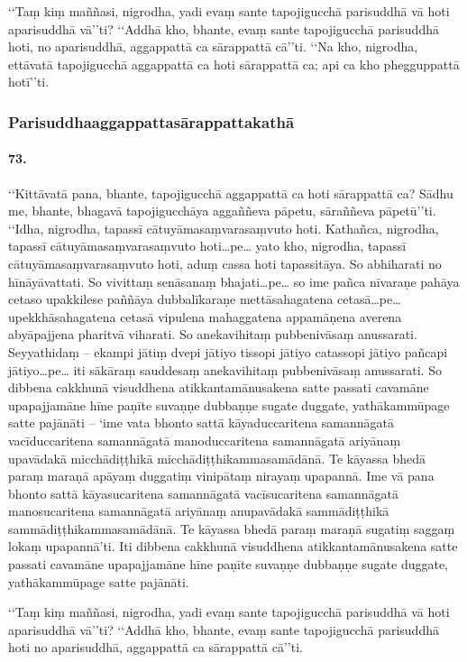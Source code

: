 ‘‘Taṃ kiṃ maññasi, nigrodha, yadi evaṃ sante tapojigucchā parisuddhā vā hoti aparisuddhā vā’’ti? ‘‘Addhā kho, bhante, evaṃ sante tapojigucchā parisuddhā hoti, no aparisuddhā, aggappattā ca sārappattā cā’’ti. ‘‘Na kho, nigrodha, ettāvatā tapojigucchā aggappattā ca hoti sārappattā ca; api ca kho phegguppattā hotī’’ti.

\subsubsection{Parisuddhaaggappattasārappattakathā}

\paragraph{73.} ‘‘Kittāvatā pana, bhante, tapojigucchā aggappattā ca hoti sārappattā ca? Sādhu me, bhante, bhagavā tapojigucchāya aggaññeva pāpetu, sāraññeva pāpetū’’ti. ‘‘Idha, nigrodha, tapassī cātuyāmasaṃvarasaṃvuto hoti. Kathañca, nigrodha, tapassī cātuyāmasaṃvarasaṃvuto hoti…pe… yato kho, nigrodha, tapassī cātuyāmasaṃvarasaṃvuto hoti, aduṃ cassa hoti tapassitāya. So abhiharati no hīnāyāvattati. So vivittaṃ senāsanaṃ bhajati…pe… so ime pañca nīvaraṇe pahāya cetaso upakkilese paññāya dubbalīkaraṇe mettāsahagatena cetasā…pe… upekkhāsahagatena cetasā vipulena mahaggatena appamāṇena averena abyāpajjena pharitvā viharati. So anekavihitaṃ pubbenivāsaṃ anussarati. Seyyathidaṃ – ekampi jātiṃ dvepi jātiyo tissopi jātiyo catassopi jātiyo pañcapi jātiyo…pe… iti sākāraṃ sauddesaṃ anekavihitaṃ pubbenivāsaṃ anussarati. So dibbena cakkhunā visuddhena atikkantamānusakena satte passati cavamāne upapajjamāne hīne paṇīte suvaṇṇe dubbaṇṇe sugate duggate, yathākammūpage satte pajānāti – ‘ime vata bhonto sattā kāyaduccaritena samannāgatā vacīduccaritena samannāgatā manoduccaritena samannāgatā ariyānaṃ upavādakā micchādiṭṭhikā micchādiṭṭhikammasamādānā. Te kāyassa bhedā paraṃ maraṇā apāyaṃ duggatiṃ vinipātaṃ nirayaṃ upapannā. Ime vā pana bhonto sattā kāyasucaritena samannāgatā vacīsucaritena samannāgatā manosucaritena samannāgatā ariyānaṃ anupavādakā sammādiṭṭhikā sammādiṭṭhikammasamādānā. Te kāyassa bhedā paraṃ maraṇā sugatiṃ saggaṃ lokaṃ upapannā’ti. Iti dibbena cakkhunā visuddhena atikkantamānusakena satte passati cavamāne upapajjamāne hīne paṇīte suvaṇṇe dubbaṇṇe sugate duggate, yathākammūpage satte pajānāti.

‘‘Taṃ kiṃ maññasi, nigrodha, yadi evaṃ sante tapojigucchā parisuddhā vā hoti aparisuddhā vā’’ti? ‘‘Addhā kho, bhante, evaṃ sante tapojigucchā parisuddhā hoti no aparisuddhā, aggappattā ca sārappattā cā’’ti.

